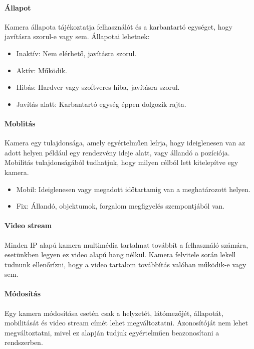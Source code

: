   \paragraph{Állapot} Kamera állapota tájékoztatja felhasználót és a karbantartó egységet, hogy javításra szorul-e vagy sem. Állapotai lehetnek:
  \begin{itemize}
    \item Inaktív: Nem elérhető, javításra szorul.
    \item Aktív: Működik.
    \item Hibás: Hardver vagy szoftveres hiba, javításra szorul.
    \item Javítás alatt: Karbantartó egység éppen dolgozik rajta.
  \end{itemize}

  \paragraph{Moblitás} Kamera egy tulajdonsága, amely egyértelműen leírja, hogy ideiglenesen van az adott helyen például egy rendezvény ideje alatt, vagy állandó a pozíciója. Mobilitás tulajdonságából tudhatjuk, hogy milyen célból lett kitelepítve egy kamera.
  \begin{itemize}
    \item Mobil: Ideiglenesen vagy megadott időtartamig van a meghatározott helyen.
    \item Fix: Állandó, objektumok, forgalom megfigyelés szempontjából van.
  \end{itemize}
  
  \paragraph{Video stream} Minden IP alapú kamera multimédia tartalmat továbbít a felhasználó számára, esetünkben legyen ez video alapú hang nélkül. Kamera felvitele során lekell tudnunk ellenőrízni, hogy a video tartalom továbbítás valóban működik-e vagy sem.
  
  \paragraph{Módosítás} Egy kamera módosítása esetén csak a helyzetét, látómezőjét, állapotát, mobilitását és video stream címét lehet megváltoztatni. Azonosítóját nem lehet megváltoztatni, mivel ez alapján tudjuk egyértelműen beazonosítani a rendszerben.
  

